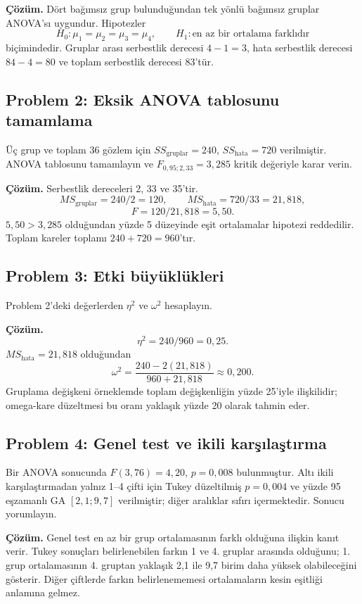 \textbf{Çözüm.} Dört bağımsız grup bulunduğundan tek yönlü bağımsız gruplar
ANOVA'sı uygundur. Hipotezler
\[
H_0:\mu_1=\mu_2=\mu_3=\mu_4,
\qquad H_1:\text{en az bir ortalama farklıdır}
\]
biçimindedir. Gruplar arası serbestlik derecesi $4-1=3$, hata serbestlik
derecesi $84-4=80$ ve toplam serbestlik derecesi $83$'tür.

\subsection*{Problem 2: Eksik ANOVA tablosunu tamamlama}

Üç grup ve toplam 36 gözlem için $SS_{\text{gruplar}}=240$,
$SS_{\text{hata}}=720$ verilmiştir. ANOVA tablosunu tamamlayın ve
$F_{0{,}95;2,33}=3{,}285$ kritik değeriyle karar verin.

\textbf{Çözüm.} Serbestlik dereceleri 2, 33 ve 35'tir.
\[
MS_{\text{gruplar}}=240/2=120,
\qquad MS_{\text{hata}}=720/33=21{,}818,
\]
\[
F=120/21{,}818=5{,}50.
\]
$5{,}50>3{,}285$ olduğundan yüzde 5 düzeyinde eşit ortalamalar hipotezi
reddedilir. Toplam kareler toplamı $240+720=960$'tır.

\subsection*{Problem 3: Etki büyüklükleri}

Problem 2'deki değerlerden $\eta^2$ ve $\omega^2$ hesaplayın.

\textbf{Çözüm.}
\[
\eta^2=240/960=0{,}25.
\]
$MS_{\text{hata}}=21{,}818$ olduğundan
\[
\omega^2
=\frac{240-2(21{,}818)}{960+21{,}818}
\approx0{,}200.
\]
Gruplama değişkeni örneklemde toplam değişkenliğin yüzde 25'iyle ilişkilidir;
omega-kare düzeltmesi bu oranı yaklaşık yüzde 20 olarak tahmin eder.

\subsection*{Problem 4: Genel test ve ikili karşılaştırma}

Bir ANOVA sonucunda $F(3,76)=4{,}20$, $p=0{,}008$ bulunmuştur. Altı ikili
karşılaştırmadan yalnız 1--4 çifti için Tukey düzeltilmiş $p=0{,}004$ ve
yüzde 95 eşzamanlı GA $[2{,}1;9{,}7]$ verilmiştir; diğer aralıklar sıfırı
içermektedir. Sonucu yorumlayın.

\textbf{Çözüm.} Genel test en az bir grup ortalamasının farklı olduğuna
ilişkin kanıt verir. Tukey sonuçları belirlenebilen farkın 1 ve 4. gruplar
arasında olduğunu; 1. grup ortalamasının 4. gruptan yaklaşık 2,1 ile 9,7 birim
daha yüksek olabileceğini gösterir. Diğer çiftlerde farkın belirlenememesi
ortalamaların kesin eşitliği anlamına gelmez.

